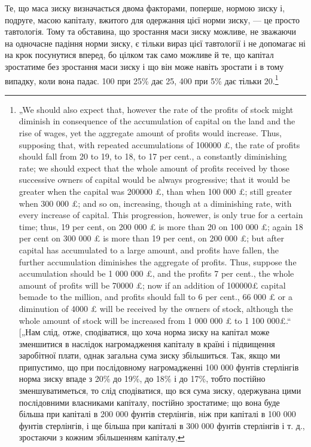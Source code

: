 Те, що маса зиску визначається двома факторами, поперше,
нормою зиску і, подруге, масою капіталу, вжитого для одержання
цієї норми зиску, — це просто тавтологія. Тому та обставина,
що зростання маси зиску можливе, не зважаючи на одночасне
падіння норми зиску, є тільки вираз цієї тавтології і
не допомагає ні на крок посунутися вперед, бо цілком так само
можливе й те, що капітал зростатиме без зростання маси зиску
і що він може навіть зростати і в тому випадку, коли вона
падає. 100 при 25\% дає 25, 400 при 5\% дає тільки 20.\footnote{
„We should also expect that, however the rate of the profits of stock
might diminish in consequence of the accumulation of capital on the land and the
rise of wages, yet the aggregate amount of profits would increase. Thus, supposing
that, with repeated accumulations of 100000 £, the rate of profits should fall from
20 to 19, to 18, to 17 per cent., a constantly diminishing rate; we should expect that
the whole amount of profits received by those successive owners of capital would be
always progressive; that it would be greater when the capital was 200000 £, than
when 100 000 £; still greater when 300 000  £; and so on, increasing, though at a
diminishing rate, with every increase of capital. This progression, howewer, is only
true for a certain time; thus, 19 per cent, on 200 000 £ is more than 20 on 100 000 £;
again 18 per cent on 300 000 £ is more than 19 per cent, on 200 000 £; but after
capital has accumulated to a large amount, and profits have fallen, the further
accumulation diminishes the aggregate of profits. Thus, suppose the accumulation
should be 1 000 000 £, and the profits 7 per cent., the whole amount of profits will be
70000 £; now if an addition of 100000£ capital bemade to the million, and profits should
fall to 6 per cent., 66 000 £ or a diminution of 4000 £ will be received by the owners
of stock, although the whole amount of stock will be increased from 1 000 000 £ to
1 100 000£.“ [„Нам слід, отже, сподіватися, що хоча норма зиску на капітал може
зменшитися в наслідок нагромадження капіталу в країні і підвищення заробітної
плати, однак загальна сума зиску збільшиться. Так, якщо ми припустимо, що при
послідовному нагромадженні 100 000 фунтів стерлінгів норма зиску впаде з 20\% до
19\%, до 18\% і до 17\%, тобто постійно зменшуватиметься, то слід сподіватися,
що вся сума зиску, одержувана цими послідовними власниками капіталу, постійно
зростатиме; що вона буде більша при капіталі в 200 000 фунтів стерлінгів,
ніж при капіталі в 100 000 фунтів стерлінгів, і ще більша при капіталі
в 300 000 фунтів стерлінгів і т. д., зростаючи з кожним збільшенням капіталу,
}
